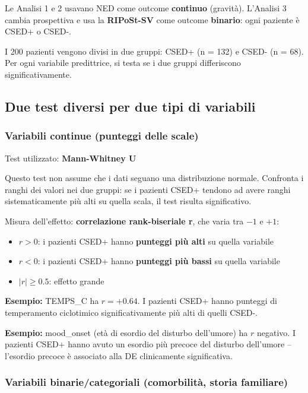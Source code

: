 \documentclass[12pt, a4paper]{article}
\begin{document}
Le Analisi 1 e 2 usavano NED come outcome \textbf{continuo} (gravità). L'Analisi 3 cambia
prospettiva e usa la \textbf{RIPoSt-SV} come outcome \textbf{binario}: ogni paziente è
CSED+ o CSED-.

I 200 pazienti vengono divisi in due gruppi: CSED+ (n = 132) e CSED- (n = 68). Per ogni
variabile predittrice, si testa se i due gruppi differiscono significativamente.

\subsection{Due test diversi per due tipi di variabili}

\subsubsection{Variabili continue (punteggi delle scale)}

Test utilizzato: \textbf{Mann-Whitney U}

Questo test non assume che i dati seguano una distribuzione normale. Confronta i ranghi
dei valori nei due gruppi: se i pazienti CSED+ tendono ad avere ranghi sistematicamente
più alti su quella scala, il test risulta significativo.

Misura dell'effetto: \textbf{correlazione rank-biseriale r}, che varia tra $-1$ e $+1$:
\begin{itemize}
    \item $r > 0$: i pazienti CSED+ hanno \textbf{punteggi più alti} su quella variabile
    \item $r < 0$: i pazienti CSED+ hanno \textbf{punteggi più bassi} su quella variabile
    \item $|r| \geq 0.5$: effetto grande
\end{itemize}

\textbf{Esempio:} TEMPS\_C ha $r = +0.64$. I pazienti CSED+ hanno punteggi di temperamento
ciclotimico significativamente più alti di quelli CSED-.

\textbf{Esempio:} mood\_onset (età di esordio del disturbo dell'umore) ha $r$ negativo.
I pazienti CSED+ hanno avuto un esordio più precoce del disturbo dell'umore -- l'esordio
precoce è associato alla DE clinicamente significativa.

\subsubsection{Variabili binarie/categoriali (comorbilità, storia familiare)}
\end{document}
